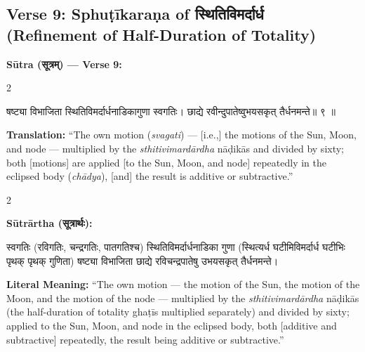 \documentclass[11pt,a4paper]{article}
\newcommand{\dev}[1]{{\devanagarifont #1}}
\newenvironment{sanskritverse}{%
  \begin{center}\begin{minipage}{0.95\textwidth}
  \setlength{\leftskip}{1em}
  \setlength{\rightskip}{1em}
  \dev
}{\end{minipage}\end{center}}
\begin{document}
\subsection{Verse 9: Sphuṭīkaraṇa of \texorpdfstring{{\devanagarifont स्थितिविमर्दार्ध}}{sthitivimardārdha} (Refinement of Half-Duration of Totality)}

\vspace{0.5em}
\noindent\textbf{Sūtra (\dev{सूत्रम्}) — Verse 9:}

\begin{paracol}{2}

\begin{sanskritverse}
षष्ट्या विभाजिता स्थितिविमर्दार्धनाडिकागुणा स्वगतिः।
छाद्ये रवीन्दुपातेष्वुभयसकृत् तैर्धनमन्ते॥ ९ ॥
\end{sanskritverse}

\switchcolumn

\textbf{Translation:} ``The own motion (\textit{svagati}) --- [i.e.,] the motions of the Sun, Moon, and node --- multiplied by the \textit{sthitivimardārdha} nāḍikās and divided by sixty; both [motions] are applied [to the Sun, Moon, and node] repeatedly in the eclipsed body (\textit{chādya}), [and] the result is additive or subtractive.''

\end{paracol}

\vspace{0.5em}

\begin{paracol}{2}

\noindent\textbf{Sūtrārtha (\dev{सूत्रार्थः}):}
\begin{sanskritverse}
स्वगतिः (रविगतिः, चन्द्रगतिः, पातगतिश्च) स्थितिविमर्दार्धनाडिका गुणा
(स्थित्यर्ध घटीमिविमर्दार्ध घटीभिः पृथक् पृथक् गुणिता) षष्ट्या विभाजिता छाद्ये
रविचन्द्रपातेषु उभयसकृत् तैर्धनमन्ते।
\end{sanskritverse}

\switchcolumn

\textbf{Literal Meaning:} ``The own motion --- the motion of the Sun, the motion of the Moon, and the motion of the node --- multiplied by the \textit{sthitivimardārdha} nāḍikās (the half-duration of totality ghaṭīs multiplied separately) and divided by sixty; applied to the Sun, Moon, and node in the eclipsed body, both [additive and subtractive] repeatedly, the result being additive or subtractive.''

\end{paracol}
\end{document}
